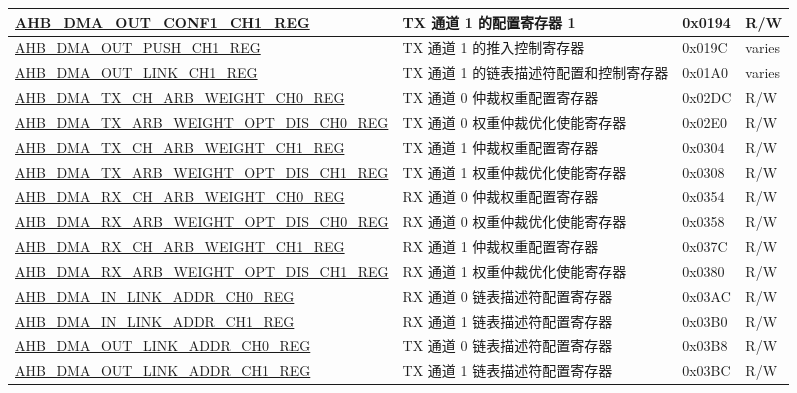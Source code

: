 \begin{longtable}{ | p{8cm} | p{8cm} | p{1.3cm} | p{1.5cm} | }
\hyperref[regdesc:AHBDMAOUTCONF1CHNREG]{AHB\_DMA\_OUT\_CONF1\_CH1\_REG} & TX 通道 1 的配置寄存器 1 & 0x0194 & R/W \\ \hline
\hyperref[regdesc:AHBDMAOUTPUSHCHNREG]{AHB\_DMA\_OUT\_PUSH\_CH1\_REG} & TX 通道 1 的推入控制寄存器 & 0x019C & varies \\ \hline
\hyperref[regdesc:AHBDMAOUTLINKCHNREG]{AHB\_DMA\_OUT\_LINK\_CH1\_REG} & TX 通道 1 的链表描述符配置和控制寄存器 & 0x01A0 & varies \\ \hline
\hyperref[regdesc:AHBDMATXCHARBWEIGHTCHNREG]{AHB\_DMA\_TX\_CH\_ARB\_WEIGHT\_CH0\_REG} & TX 通道 0 仲裁权重配置寄存器 & 0x02DC & R/W \\ \hline
\hyperref[regdesc:AHBDMATXARBWEIGHTOPTDISCHNREG]{AHB\_DMA\_TX\_ARB\_WEIGHT\_OPT\_DIS\_CH0\_REG} & TX 通道 0 权重仲裁优化使能寄存器 & 0x02E0 & R/W \\ \hline
\hyperref[regdesc:AHBDMATXCHARBWEIGHTCHNREG]{AHB\_DMA\_TX\_CH\_ARB\_WEIGHT\_CH1\_REG} & TX 通道 1 仲裁权重配置寄存器 & 0x0304 & R/W \\ \hline
\hyperref[regdesc:AHBDMATXARBWEIGHTOPTDISCHNREG]{AHB\_DMA\_TX\_ARB\_WEIGHT\_OPT\_DIS\_CH1\_REG} & TX 通道 1 权重仲裁优化使能寄存器 & 0x0308 & R/W \\ \hline
\hyperref[regdesc:AHBDMARXCHARBWEIGHTCHNREG]{AHB\_DMA\_RX\_CH\_ARB\_WEIGHT\_CH0\_REG} & RX 通道 0 仲裁权重配置寄存器 & 0x0354 & R/W \\ \hline
\hyperref[regdesc:AHBDMARXARBWEIGHTOPTDISCHNREG]{AHB\_DMA\_RX\_ARB\_WEIGHT\_OPT\_DIS\_CH0\_REG} & RX 通道 0 权重仲裁优化使能寄存器 & 0x0358 & R/W \\ \hline
\hyperref[regdesc:AHBDMARXCHARBWEIGHTCHNREG]{AHB\_DMA\_RX\_CH\_ARB\_WEIGHT\_CH1\_REG} & RX 通道 1 仲裁权重配置寄存器 & 0x037C & R/W \\ \hline
\hyperref[regdesc:AHBDMARXARBWEIGHTOPTDISCHNREG]{AHB\_DMA\_RX\_ARB\_WEIGHT\_OPT\_DIS\_CH1\_REG} & RX 通道 1 权重仲裁优化使能寄存器 & 0x0380 & R/W \\ \hline
\hyperref[regdesc:AHBDMAINLINKADDRCHNREG]{AHB\_DMA\_IN\_LINK\_ADDR\_CH0\_REG} & RX 通道 0 链表描述符配置寄存器 & 0x03AC & R/W \\ \hline
\hyperref[regdesc:AHBDMAINLINKADDRCHNREG]{AHB\_DMA\_IN\_LINK\_ADDR\_CH1\_REG} & RX 通道 1 链表描述符配置寄存器 & 0x03B0 & R/W \\ \hline
\hyperref[regdesc:AHBDMAOUTLINKADDRCHNREG]{AHB\_DMA\_OUT\_LINK\_ADDR\_CH0\_REG} & TX 通道 0 链表描述符配置寄存器 & 0x03B8 & R/W \\ \hline
\hyperref[regdesc:AHBDMAOUTLINKADDRCHNREG]{AHB\_DMA\_OUT\_LINK\_ADDR\_CH1\_REG} & TX 通道 1 链表描述符配置寄存器 & 0x03BC & R/W \\ \hline

\end{longtable}
